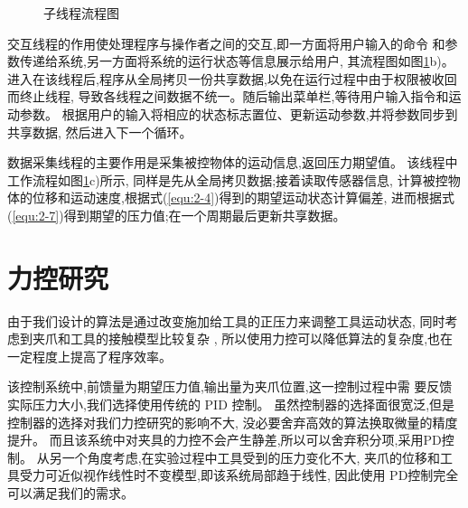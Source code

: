 \begin{figure}[!ht]
{    }
  \caption{子线程流程图}
  \label{fig:3-2}
  \vspace{-0.3cm}
\end{figure}

交互线程的作用使处理程序与操作者之间的交互,即一方面将用户输入的命令
和参数传递给系统,另一方面将系统的运行状态等信息展示给用户, 
其流程图如图\ref{fig:3-2}b)。
进入在该线程后,程序从全局拷贝一份共享数据,以免在运行过程中由于权限被收回而终止线程,
导致各线程之间数据不统一。随后输出菜单栏,等待用户输入指令和运动参数。
根据用户的输入将相应的状态标志置位、更新运动参数,并将参数同步到共享数据,
然后进入下一个循环。

数据采集线程的主要作用是采集被控物体的运动信息,返回压力期望值。
该线程中工作流程如图\ref{fig:3-2}c)所示, 同样是先从全局拷贝数据;接着读取传感器信息,
计算被控物体的位移和运动速度,根据式(\ref{equ:2-4})得到的期望运动状态计算偏差,
进而根据式(\ref{equ:2-7})得到期望的压力值;在一个周期最后更新共享数据。


\section{力控研究}
由于我们设计的算法是通过改变施加给工具的正压力来调整工具运动状态,
同时考虑到夹爪和工具的接触模型比较复杂 \cite{ref11} ,
所以使用力控可以降低算法的复杂度,也在一定程度上提高了程序效率。

该控制系统中,前馈量为期望压力值,输出量为夹爪位置,这一控制过程中需
要反馈实际压力大小,我们选择使用传统的 PID 控制。
虽然控制器的选择面很宽泛,但是控制器的选择对我们力控研究的影响不大,
没必要舍弃高效的算法换取微量的精度提升。
而且该系统中对夹具的力控不会产生静差,所以可以舍弃积分项,采用PD控制。
从另一个角度考虑,在实验过程中工具受到的压力变化不大,
夹爪的位移和工具受力可近似视作线性时不变模型,即该系统局部趋于线性,
因此使用 PD控制完全可以满足我们的需求。

